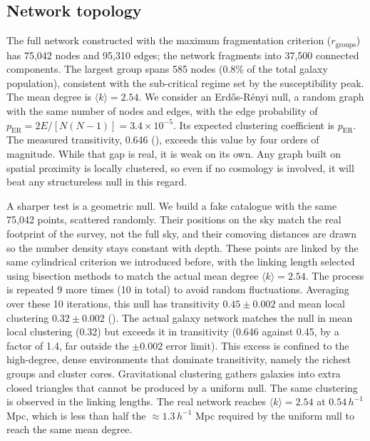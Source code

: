 \documentclass[9pt,a4paper,twocolumn,twoside]{rho-class/rho}
\begin{document}
\subsection{Network topology}

The full network constructed with the maximum fragmentation criterion ($r_{\mathrm{groups}}$)
has 75,042 nodes and 95,310 edges; the network fragments into 37,500 connected components.
The largest group spans 585 nodes (0.8\% of the total galaxy population), consistent
with the sub-critical regime set by the susceptibility peak. The
mean degree is $\langle k\rangle = 2.54$. We consider an Erd\H{o}s-R\'enyi null,
a random graph with the same number of nodes and edges, with the edge probability of
$p_{\mathrm{ER}} = 2E/[N(N-1)] = 3.4\times10^{-5}$. Its expected clustering
coefficient is $p_{\mathrm{ER}}$. The measured transitivity, 0.646
(), exceeds this value by four orders of magnitude. While that
gap is real, it is weak on its own. Any graph built on spatial proximity
is locally clustered, so even if no cosmology is involved, it will beat any structureless
null in this regard.

A sharper test is a geometric null. We build a fake catalogue with the same 75,042 points,
scattered randomly. Their positions on the sky match the real footprint of the survey,
not the full sky, and their comoving distances are drawn so the number density stays constant
with depth.
These points are linked by the same cylindrical criterion we introduced before, with the
linking length selected using bisection methods to match the actual mean degree
$\langle k\rangle = 2.54$. The process is repeated 9 more times (10 in total) to avoid
random fluctuations. Averaging over these 10 iterations, this null has transitivity $0.45 \pm 0.002$
and mean local clustering $0.32 \pm 0.002$ (). The actual galaxy network matches
the null in mean local clustering (0.32) but exceeds it in transitivity (0.646 against
0.45, by a factor of 1.4, far outside the $\pm 0.002$ error limit).
This excess is confined to the high-degree, dense environments that dominate
transitivity, namely the richest groups and cluster cores.
Gravitational clustering gathers galaxies into extra closed triangles that cannot
be produced by a uniform null. The same clustering is observed in the linking lengths. The
real network reaches $\langle k\rangle = 2.54$ at $0.54\,h^{-1}$ Mpc, which is less
than half the $\approx 1.3\,h^{-1}$ Mpc required by the uniform null to reach the same
mean degree.
\end{document}
